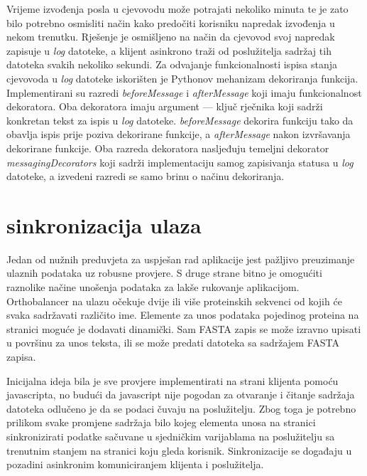     
Vrijeme izvođenja posla u cjevovodu može potrajati nekoliko minuta te je zato
bilo potrebno osmisliti način kako predočiti korisniku napredak izvođenja u
nekom trenutku. Rješenje je osmišljeno na način da cjevovod svoj napredak
zapisuje u \emph{log} datoteke, a klijent asinkrono traži od poslužitelja
sadržaj tih datoteka svakih nekoliko sekundi. Za odvajanje funkcionalnosti
ispisa stanja cjevovoda u \emph{log} datoteke iskorišten je Pythonov mehanizam
dekoriranja funkcija. Implementirani su razredi \emph{beforeMessage} i
\emph{afterMessage} koji imaju funkcionalnost dekoratora. Oba dekoratora imaju
argument --- ključ rječnika koji sadrži konkretan tekst za ispis u \emph{log}
datoteke. \emph{beforeMessage} dekorira funkciju tako da obavlja ispis prije
poziva dekorirane funkcije, a \emph{afterMessage} nakon izvršavanja dekorirane
funkcije. Oba razreda dekoratora nasljeđuju temeljni dekorator
\emph{messagingDecorators} koji sadrži implementaciju samog zapisivanja statusa
u \emph{log} datoteke, a izvedeni razredi se samo brinu o načinu dekoriranja.



\section{sinkronizacija ulaza}
\label{sec:input}


Jedan od nužnih preduvjeta za uspješan rad aplikacije jest pažljivo preuzimanje
ulaznih podataka uz robusne provjere. S druge strane bitno je omogućiti
raznolike načine unošenja podataka za lakše rukovanje aplikacijom. Orthobalancer
na ulazu očekuje dvije ili više proteinskih sekvenci od kojih će svaka
sadržavati različito ime. Elemente za unos podataka pojedinog proteina na
stranici moguće je dodavati dinamički. Sam FASTA zapis se može izravno upisati u
površinu za unos teksta, ili se može predati datoteka sa sadržajem FASTA zapisa.

Inicijalna ideja bila je sve provjere implementirati na strani klijenta pomoću
javascripta, no budući da javascript nije pogodan za otvaranje i čitanje
sadržaja datoteka odlučeno je da se podaci čuvaju na poslužitelju. Zbog toga je
potrebno prilikom svake promjene sadržaja bilo kojeg elementa unosa na stranici
sinkronizirati podatke sačuvane u sjedničkim varijablama na poslužitelju sa
trenutnim stanjem na stranici koju gleda korisnik. Sinkronizacije se događaju u
pozadini asinkronim komuniciranjem klijenta i poslužitelja.


